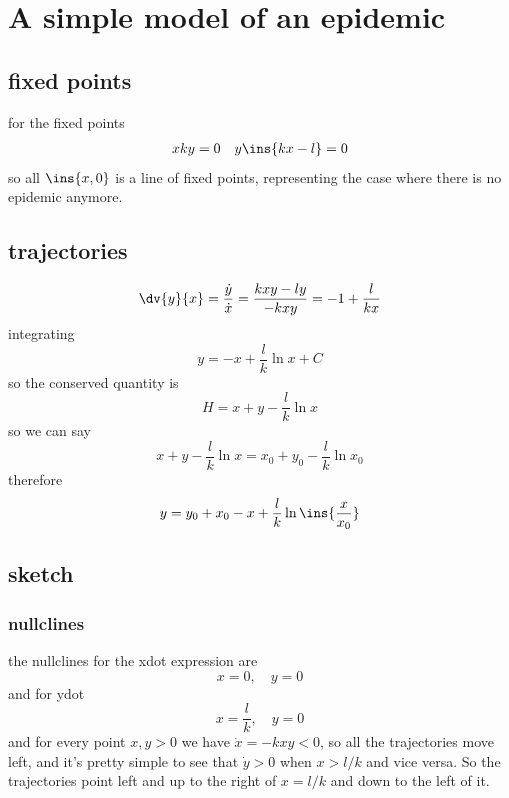 \clearpage 
\section{A simple model of an epidemic}
\subsection{fixed points}
for the fixed points 
\begin{align}
    xky=0 && y\ins{kx-l}=0
\end{align}
so all \(\ins{x,0}\) is a line of fixed points, representing the case where there is no epidemic anymore.
\subsection{trajectories}
\begin{equation}
    \dv{y}{x} = \frac{\dot{y}}{\dot{x}}=\frac{kxy-ly}{-kxy}=-1+\frac{l}{kx}
\end{equation}
integrating 
\begin{equation}
    y=-x+\frac{l}{k}\ln x +C
\end{equation}
so the conserved quantity is 
\begin{equation}
    H = x+y-\frac{l}{k}\ln x
\end{equation}
so we can say 
\begin{equation}
    x+y-\frac{l}{k}\ln x = x_0+y_0-\frac{l}{k}\ln x_0
\end{equation}
therefore 
\begin{equation}
    y = y_0+x_0-x+\frac{l}{k}\ln\ins{\frac{x}{x_0}}
\end{equation}
\subsection{sketch}
\subsubsection{nullclines}
the nullclines for the xdot expression are 
\begin{equation}
    x=0,\quad y=0
\end{equation}
and for ydot
\begin{equation}
    x=\frac{l}{k},\quad y=0
\end{equation}
and for every point \(x,y>0\) we have \(\dot{x}=-kxy<0\), so all the trajectories move left, and it's pretty simple to see that \(\dot{y}>0\) when \(x>l/k\) and vice versa. So the trajectories point left and up to the right of \(x=l/k\) and down to the left of it.
